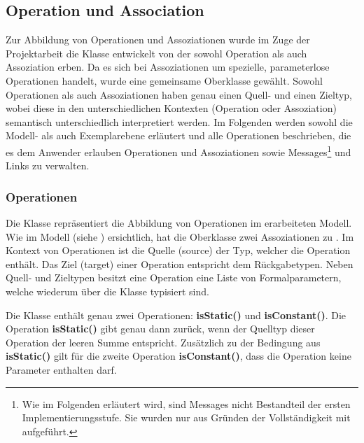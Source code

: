 \subsection{Operation und Association}

Zur Abbildung von Operationen und Assoziationen wurde im Zuge der Projektarbeit die Klasse  entwickelt von der sowohl Operation als auch Assoziation erben. 
Da es sich bei Assoziationen um spezielle, parameterlose Operationen handelt, wurde eine gemeinsame Oberklasse gewählt.
Sowohl Operationen als auch Assoziationen haben genau einen Quell- und einen Zieltyp, wobei diese in den unterschiedlichen Kontexten (Operation oder Assoziation) semantisch unterschiedlich interpretiert werden. 
Im Folgenden werden sowohl die Modell- als auch Exemplarebene erläutert und alle Operationen beschrieben, die es dem Anwender erlauben Operationen und Assoziationen 
sowie Messages\footnote{Wie im Folgenden erläutert wird, sind Messages nicht Bestandteil der ersten Implementierungsstufe. Sie wurden nur aus Gründen der Vollständigkeit mit aufgeführt.} und Links zu verwalten.  

\subsubsection{Operationen}

Die Klasse  repräsentiert die Abbildung von Operationen im erarbeiteten Modell.
Wie im Modell (siehe ) ersichtlich, hat die Oberklasse  zwei Assoziationen zu . 
Im Kontext von Operationen ist die Quelle (source) der Typ, welcher die Operation enthält. 
Das Ziel (target) einer Operation entspricht dem Rückgabetypen.
Neben Quell- und Zieltypen besitzt eine Operation eine Liste von Formalparametern, welche 
wiederum über die Klasse  typisiert sind.

Die Klasse  enthält genau zwei Operationen: \textbf{isStatic()} und \textbf{isConstant()}.
Die Operation \textbf{isStatic()} gibt genau dann  zurück, wenn der Quelltyp dieser Operation der leeren Summe entspricht.
Zusätzlich zu der Bedingung aus \textbf{isStatic()} gilt für die zweite Operation \textbf{isConstant()}, dass die Operation keine Parameter enthalten darf. 



